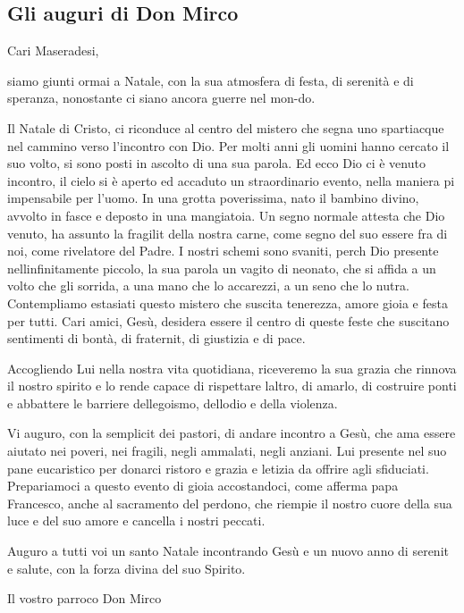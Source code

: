 \documentclass[a5paper,10pt]{article} %
\title{}
\author{}
\begin{document}
  
  \clearpage
  
  \clearpage 
\begin{justify}
\section{Gli auguri di Don Mirco}
Cari Maseradesi,

siamo giunti ormai a Natale, con la sua atmosfera di festa, di serenità e di speranza, nonostante ci siano ancora guerre nel mon-do.

Il Natale di Cristo, ci riconduce al centro del mistero che segna uno spartiacque nel cammino verso l'incontro con Dio. Per molti anni gli uomini hanno cercato il suo volto, si sono posti in ascolto di una sua parola. Ed ecco Dio ci è venuto incontro, il cielo si è aperto ed  accaduto un straordinario evento, nella maniera pi impensabile per l'uomo. In una grotta poverissima,  nato il bambino divino, avvolto in fasce e deposto in una mangiatoia. Un segno normale attesta che Dio  venuto, ha assunto la fragilit della nostra carne, come segno del suo essere fra di noi, come rivelatore del Padre. I nostri schemi sono svaniti, perch Dio  presente nellinfinitamente piccolo, la sua parola un vagito di neonato, che si affida a un volto che gli sorrida, a una mano che lo accarezzi, a un seno che lo nutra. Contempliamo estasiati questo mistero che suscita tenerezza, amore gioia e festa per tutti. Cari amici, Gesù, desidera essere il centro di queste feste che suscitano sentimenti di bontà, di fraternit, di giustizia e di pace.

Accogliendo Lui nella nostra vita quotidiana, riceveremo la sua grazia che rinnova il nostro spirito e lo rende capace di rispettare laltro, di amarlo, di costruire ponti e abbattere le barriere dellegoismo, dellodio e della violenza.

Vi auguro, con la semplicit dei pastori, di andare incontro a Gesù, che ama essere aiutato nei poveri, nei fragili, negli ammalati, negli anziani. Lui  presente nel suo pane eucaristico per donarci ristoro e grazia e letizia da offrire agli sfiduciati. Prepariamoci a questo evento di gioia accostandoci, come afferma papa Francesco, anche al sacramento del perdono, che riempie il nostro cuore della sua luce e del suo amore e cancella i nostri peccati.

Auguro a tutti voi un santo Natale incontrando Gesù e un nuovo anno di serenit e salute, con la forza divina del suo Spirito.
\end{justify}
\begin{flushright}
    Il vostro parroco Don Mirco
\end{flushright}
\end{document}
